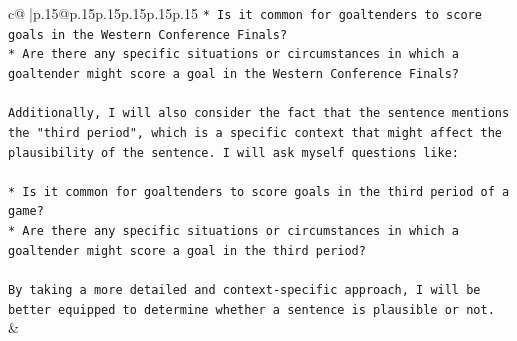 \documentclass{article}
\begin{document}
{\begin{supertabular}{c@{$\;$}|p{.15\linewidth}@{}p{.15\linewidth}p{.15\linewidth}p{.15\linewidth}p{.15\linewidth}p{.15\linewidth}}
{{{\texttt{* Is it common for goaltenders to score goals in the Western Conference Finals?} \\
\texttt{* Are there any specific situations or circumstances in which a goaltender might score a goal in the Western Conference Finals?} \\
\\ 
\texttt{Additionally, I will also consider the fact that the sentence mentions the "third period", which is a specific context that might affect the plausibility of the sentence. I will ask myself questions like:} \\
\\ 
\texttt{* Is it common for goaltenders to score goals in the third period of a game?} \\
\texttt{* Are there any specific situations or circumstances in which a goaltender might score a goal in the third period?} \\
\\ 
\texttt{By taking a more detailed and context{-}specific approach, I will be better equipped to determine whether a sentence is plausible or not.} \\
            }
        }
    }
    & \\ \\

\end{supertabular}
}
\end{document}
